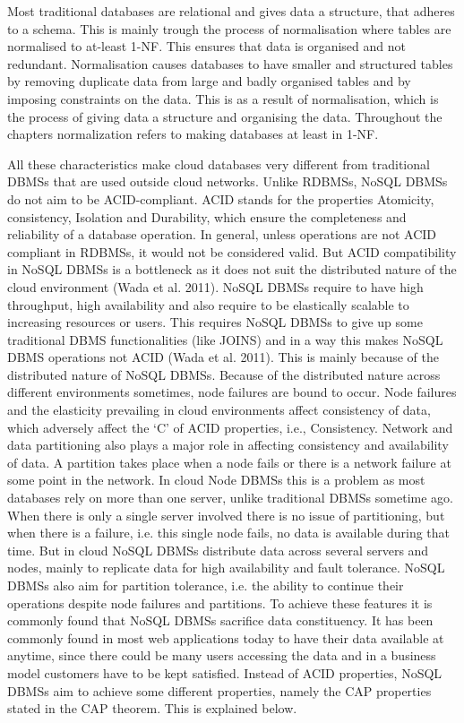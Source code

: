 Most traditional databases are relational and gives data a structure, that
adheres to a schema. This is mainly trough the process of normalisation  where
tables are normalised to at-least \ac{1-NF}. This ensures that data is organised
and not redundant. Normalisation causes databases to have smaller and structured
tables by removing duplicate data from large and badly organised tables and by
imposing constraints on the data. This is as a result of normalisation, which is
the process of giving data a structure and organising the data. Throughout the
chapters normalization refers to making databases at least in \ac{1-NF}.

All these characteristics make cloud databases very different from traditional
\acp{DBMS} that are used outside cloud networks. Unlike \acp{RDBMS}, \ac{NoSQL}
\acp{DBMS} do not aim to be ACID-compliant. ACID stands for the properties Atomicity,
consistency, Isolation and Durability, which ensure the completeness and
reliability of a database operation. In general, unless operations are not ACID
compliant in \acp{RDBMS}, it would not be considered valid.
But ACID compatibility in \ac{NoSQL} \acp{DBMS} is a bottleneck as it does not suit
the distributed nature of the cloud environment (Wada et al. 2011). \ac{NoSQL}
\acp{DBMS} require to have high throughput, high availability and also require to be
elastically scalable to increasing resources or users. This requires \ac{NoSQL}
\acp{DBMS} to give up some traditional \ac{DBMS} functionalities (like JOINS)
and in a way this makes \ac{NoSQL} \ac{DBMS} operations not ACID (Wada et al. 2011).
This is mainly because of the distributed nature of \ac{NoSQL} \acp{DBMS}. Because of the
distributed nature across different environments sometimes, node failures are
bound to occur. Node failures and the elasticity prevailing in cloud
environments affect consistency
of data, which adversely affect the ‘C’ of ACID properties, i.e., Consistency. 
Network and data partitioning also plays a major role in affecting consistency
and availability of data.  A partition takes place when a node fails or there is
a network failure at some point in the network. In cloud \ac{Node} \acp{DBMS} this is a
problem as most databases rely on more than one server, unlike traditional DBMSs
sometime ago. When there is only a single server involved there is no issue of
partitioning, but when there is a failure, i.e. this single node fails, no data
is available during that time. But in cloud \ac{NoSQL} \acp{DBMS} distribute
data across several servers and nodes, mainly to replicate data for high availability and
fault tolerance. \ac{NoSQL} \acp{DBMS} also aim for partition tolerance, i.e. the ability
to continue their operations despite node failures and partitions. To achieve
these features it is commonly found that \ac{NoSQL} \acp{DBMS} sacrifice data
constituency. It has been commonly found in most web applications today to have
their data available at anytime, since there could be many users accessing the
data and in a business model customers have to be kept satisfied.
Instead of ACID properties, \ac{NoSQL} \acp{DBMS} aim to achieve some different
properties, namely the CAP properties stated in the CAP theorem. This is
explained below.

